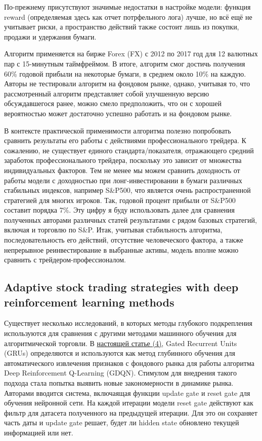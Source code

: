 \documentclass[a4paper,14pt]{extarticle}
\newcommand{\bibref}[3]{\hyperlink{#1}{#2 (#3)}} %
\begin{document}
По-прежнему присутствуют значимые недостатки в настройке модели: функция reward (определяемая здесь как отчет потрфельного лога) лучше, но всё ещё не учитывает риски, а пространство действий также состоит лишь из покупки, продажи и удержания бумаги.

Алгоритм применяется на бирже Forex (FX) с 2012 по 2017 год для 12 валютных пар с 15-минутным таймфреймом. В итоге, алгоритм смог достичь получения 60\% годовой прибыли на некоторые бумаги, в среднем около 10\% на каждую. Авторы не тестировали алгоритм на фондовом рынке, однако, учитывая то, что рассмотренный алгоритм представляет собой улучшенную версию обсуждавшегося ранее, можно смело предположить, что он с хорошей вероятностью может достаточно успешно работать и на фондовом рынке.

В контексте практической применимости алгоритма полезно попробовать сравнить результаты его работы с действиями профессионального трейдера. К сожалению, не существует единого стандарта/показателя, отражающего средний заработок профессионального трейдера, поскольку это зависит от множества индивидуальных факторов. Тем не менее мы можем сравнить доходность от работы модели с доходностью при лонг-инвестировании в бумаги различных стабильных индексов, например S\&P500, что является очень распространенной стратегией для многих игроков. Так, годовой процент прибыли от S\&P500 составит порядка 7\%. Эту цифру я буду использовать далее для сравнения полученных авторами различных статей результатами с рядом базовых стратегий, включая и торговлю по S\&P. Итак, учитывая стабильность алгоритма, последовательность его действий, отсутствие человеческого фактора, а также непрерывное реинвестирование в выбранные активы, модель вполне можно сравнить с трейдером-профессионалом.

\subsection{Adaptive stock trading strategies with deep reinforcement learning methods}

Существует несколько исследований, в которых методы глубокого подкрепления используются для сравнения с другими методами машинного обучения для алгоритмической торговли. В \bibref{4}{настоящей статье}{4}, Gated Recurrent Units (GRUs) определяются и используются как метод глубинного обучения для автоматического извлечения признаков с фондового рынка для работы алгоритма Deep Reinforcement Q-Learning (GDQN). Стимулом для внедрения такого подхода стала попытка выявить новые закономерности в динамике рынка. Авторами вводится система, включаящая функции update gate и reset gate для обучения нейронной сети.
На каждой итерации модели reset gate действуют как фильтр для датасета полученного на предыдущей итерации. Для это он сохраняет часть даты и update gate решает, будет ли hidden state обновлено текущей информацией или нет.
\end{document}
